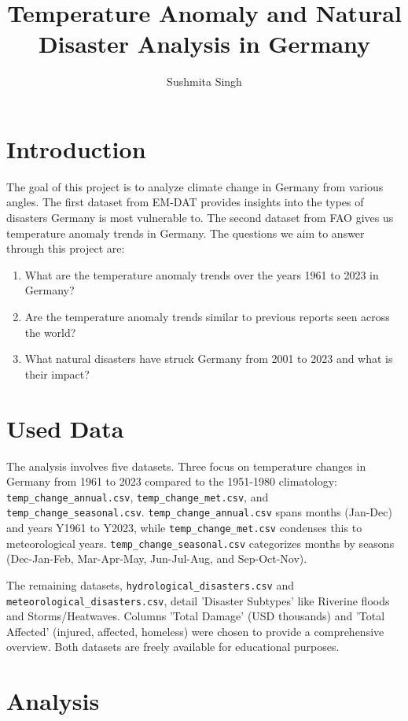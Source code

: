 \documentclass{article}
\title{Temperature Anomaly and Natural Disaster Analysis in Germany}
\author{Sushmita Singh}
\date{}
\begin{document}
\maketitle

\section{Introduction}

The goal of this project is to analyze climate change in Germany from various angles. The first dataset from EM-DAT provides insights into the types of disasters Germany is most vulnerable to. The second dataset from FAO gives us temperature anomaly trends in Germany. The questions we aim to answer through this project are:

\begin{enumerate}
    \item What are the temperature anomaly trends over the years 1961 to 2023 in Germany?
    \item Are the temperature anomaly trends similar to previous reports seen across the world?
    \item What natural disasters have struck Germany from 2001 to 2023 and what is their impact?
\end{enumerate}

\section{Used Data}

The analysis involves five datasets. Three focus on temperature changes in Germany from 1961 to 2023 compared to the 1951-1980 climatology: \texttt{temp\_change\_annual.csv}, \texttt{temp\_change\_met.csv}, and \texttt{temp\_change\_seasonal.csv}. \texttt{temp\_change\_annual.csv} spans months (Jan-Dec) and years Y1961 to Y2023, while \texttt{temp\_change\_met.csv} condenses this to meteorological years. \texttt{temp\_change\_seasonal.csv} categorizes months by seasons (Dec-Jan-Feb, Mar-Apr-May, Jun-Jul-Aug, and Sep-Oct-Nov).

The remaining datasets, \texttt{hydrological\_disasters.csv} and \texttt{meteorological\_disasters.csv}, detail 'Disaster Subtypes' like Riverine floods and Storms/Heatwaves. Columns 'Total Damage' (USD thousands) and 'Total Affected' (injured, affected, homeless) were chosen to provide a comprehensive overview. Both datasets are freely available for educational purposes.


\section{Analysis}
\end{document}
